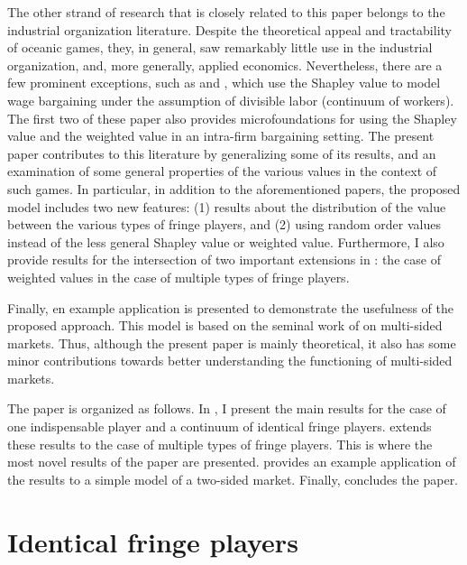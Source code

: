 \documentclass[a4paper]{article}
\begin{document}
The other strand of research that is closely related to this paper belongs to the industrial organization literature.
Despite the theoretical appeal and tractability of oceanic games, they, in general, saw remarkably little use in the industrial organization, and, more generally, applied economics.
Nevertheless, there are a few prominent exceptions, such as \textcite{stole1996intra, stole1996organizational} and \textcite{levy1997individual}, which use the Shapley value to model wage bargaining under the assumption of divisible labor (continuum of workers).
The first two of these paper also provides microfoundations for using the Shapley value and the weighted value in an intra-firm bargaining setting.
The present paper contributes to this literature by generalizing some of its results, and an examination of some general properties of the various values in the context of such games.
In particular, in addition to the aforementioned papers, the proposed model includes two new features: (1) results about the distribution of the value between the various types of fringe players, and (2) using random order values instead of the less general Shapley value or weighted value.
Furthermore, I also provide results for the intersection of two important extensions in \textcite{stole1996intra}: the case of weighted values in the case of multiple types of fringe players.

Finally, en example application is presented to demonstrate the usefulness of the proposed approach.
This model is based on the seminal work of \textcite{armstrong2006competition} on multi-sided markets.
Thus, although the present paper is mainly theoretical, it also has some minor contributions towards better understanding the functioning of multi-sided markets.

The paper is organized as follows.
In , I present the main results for the case of one indispensable player and a continuum of identical fringe players.
 extends these results to the case of multiple types of fringe players.
This is where the most novel results of the paper are presented.
 provides an example application of the results to a simple model of a two-sided market.
Finally,  concludes the paper.


\section{Identical fringe players}
\label{sec:one_sided}
\end{document}
